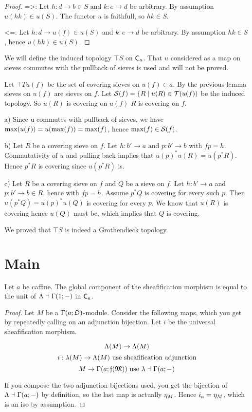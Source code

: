 \begin{proof}
=>:
Let $h: d \rightarrow b \in S$ 
and $k: e \rightarrow d$ be arbitrary.
By assumption $u(hk)\in u(S)$.
The functor $u$ is faithfull, so $hk \in S$.

<=:
Let $h: d \rightarrow u(f) \in u(S)$ 
and $k: e \rightarrow d$ be arbitrary.
By assumption $hk \in S$, hence $u(hk) \in u(S)$.
\end{proof}

We will define the induced topology $\top{S}$ on ${\mathsf{C}}_{a}$.
That $u$ considered as a map on sieves commutes with the pullback of sieves is used and will not be proved.

\begin{definition}
Let $\top{T}{u(f)}$ be the set of covering sieves on $u(f) \in a$.
By the previous lemma sieves on $u(f)$ are sieves on $f$.
Let $\top{S}{f} = \{R \suchthat u(R) \in \top{T}{u(f)}$ be the induced topology.
So $u(R)$ is covering on $u(f)$ \iff $R$ is covering on $f$.

a) Since u commutes with pullback of sieves, 
we have $\mbox{max}(u(f)) = u(\mbox{max}(f)) = \mbox{max}(f)$,
hence $\maxsieve{f} \in \top{S}{f}$.

b) Let $R$ be a covering sieve on $f$.
Let $h:b'\rightarrow a$
and $p:b' \rightarrow b$ with $fp = h$.
Commutativity of $u$ and pulling back implies that $u(p)^*u(R) = u(p^*R)$.
Hence $p^*R$ is covering since $u(p^*R)$ is.

c) Let $R$ be a covering sieve on $f$
and $Q$ be a sieve on $f$.
Let $h:b'\rightarrow a$
and $p:b' \rightarrow b \in R$,
hence with $fp = h$.
Assume $p^*Q$ is covering for every such $p$.
Then $u(p^*Q) = u(p)^*u(Q)$ is covering for every $p$.
We know that $u(R)$ is covering hence $u(Q)$ must be, which implies that $Q$ is covering.

We proved that $\top{S}$ is indeed a Grothendieck topology.
\end{definition}

\section*{Main}

\begin{lemma}
Let $a$ be caffine.
The global component of the sheafification morphism is equal to the unit of $\adj{\stilde}{\globalsections}$ in ${\mathsf{C}}_{a}$.
\end{lemma}

\begin{proof}
Let $M$ be a $\sections{a}{O}$-module.
Consider the following maps, which you get by repeatedly calling on an adjunction bijection.
Let $i$ be the universal sheafification morphism.

\[\stilde(M) \rightarrow \stilde(M)\]
\[	i : \pstilde(M) \rightarrow \stilde(M) \mbox{ use sheafification adjunction}\]
\[ M \rightarrow \sections{a}{\stilde(M)} \mbox{ use } \adj{\pstilde}{\sections{a}}\]

If you compose the two adjunction bijections used, 
you get the bijection of $\adj{\stilde}{\sections{a}}$
by definition, so the last map is actually $\eta_M$.
Hence $i_a = \eta_{M}$, which is an iso by assumption.
\end{proof}


